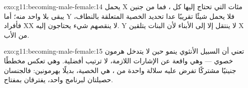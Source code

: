 \begin{solution}{exo:g11:becoming-male-female:14}
يحمل  X مئات  التي تحتاج إليها كل ، فما من جنين
يبقى بلا واحد منه؛ أما  Y فلا يحمل شيئًا تقريبًا عدا 
تحديد الخصية  المتعلقة بالنطاف، فأفراد XX لا ينقصهم شيء
يحتاجون إليه.  Y لا ينتقل إلا إلى الأبناء لأن البنات يتلقين
 X من الأب.
\end{solution}

\begin{solution}{exo:g11:becoming-male-female:15}
تعني أن السبيل الأنثوي ينمو حين لا يتدخل هرمون خصوي --- وهي واقعة عن
الإشارات اللازمة، لا ترتيب أفضلية. وهي تعكس مخططًا جنينيًا مشتركًا
تفرض عليه سلالة واحدة من ، هي الخصية، بديلًا بهرمونين: فالجنسان
حصيلتان لبرنامج واحد، يفترقان بمفتاح.
\end{solution}

